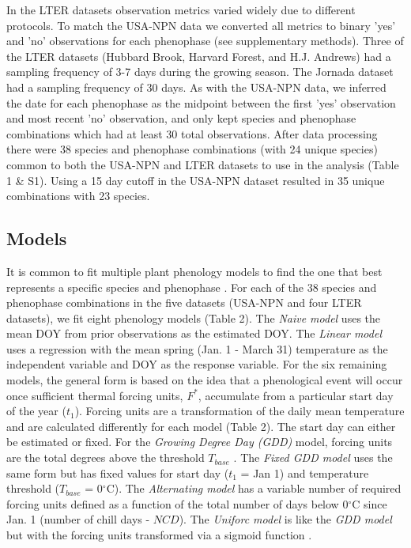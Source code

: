 \documentclass[fleqn,12pt,lineno]{article}
\begin{document}
In the LTER datasets observation metrics varied widely due to different protocols. To match the USA-NPN data we converted all metrics to binary 'yes' and 'no' observations for each phenophase (see supplementary methods). Three of the LTER datasets (Hubbard Brook, Harvard Forest, and H.J. Andrews) had a sampling frequency of 3-7 days during the growing season. The Jornada dataset had a sampling frequency of 30 days. As with the USA-NPN data, we inferred the date for each phenophase as the midpoint between the first 'yes' observation and most recent 'no' observation, and only kept species and phenophase combinations which had at least 30 total observations. After data processing there were 38 species and phenophase combinations (with 24 unique species) common to both the USA-NPN and LTER datasets to use in the analysis (Table 1 \& S1). Using a 15 day cutoff in the USA-NPN dataset resulted in 35 unique combinations with 23 species.

\subsection*{Models}

It is common to fit multiple plant phenology models to find the one that best represents a specific species and phenophase \citep{chuine2013}. For each of the 38 species and phenophase combinations in the five datasets (USA-NPN and four LTER datasets), we fit eight phenology models (Table 2). The \textit{Naive model} uses the mean DOY from prior observations as the estimated DOY. The \textit{Linear model} uses a regression with the mean spring (Jan. 1 - March 31) temperature as the independent variable and DOY as the response variable. For the six remaining models, the general form is based on the idea that a phenological event will occur once sufficient thermal forcing units, $F^{*}$, accumulate from a particular start day of the year ($t_{1}$). Forcing units are a transformation of the daily mean temperature and are calculated differently for each model (Table 2). The start day can either be estimated or fixed. For the \textit{Growing Degree Day (GDD)} model, forcing units are the total degrees above the threshold $T_{base}$ \citep{reaumur1735, wang1960, hunter1992}. The \textit{Fixed GDD model} uses the same form but has fixed values for start day ($t_{1}$ = Jan 1) and temperature threshold ($T_{base}$ = 0$^{\circ}$C). The \textit{Alternating model} has a variable number of required forcing units defined as a function of the total number of days below 0$^{\circ}$C since Jan. 1 (number of chill days - $NCD$). The \textit{Uniforc model} is like the \textit{GDD model} but with the forcing units transformed via a sigmoid function \citep{chuine2000}. 
\end{document}
